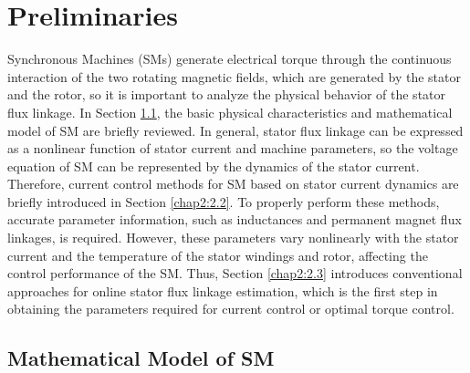 
\chapter{Preliminaries}\label{chapter2}
Synchronous Machines (SMs) generate electrical torque through the continuous interaction of the two rotating magnetic fields, which are generated by the stator and the rotor, so it is important to analyze the physical behavior of the stator flux linkage. In Section \ref{chap2:2.1}, the basic physical characteristics and mathematical model of SM are briefly reviewed. In general, stator flux linkage can be expressed as a nonlinear function of stator current and machine parameters, so the voltage equation of SM can be represented by the dynamics of the stator current. Therefore, current control methods for SM based on stator current dynamics are briefly introduced in Section \ref{chap2:2.2}. To properly perform these methods, accurate parameter information, such as inductances and permanent magnet flux linkages, is required. However, these parameters vary nonlinearly with the stator current and the temperature of the stator windings and rotor, affecting the control performance of the SM. Thus, Section \ref{chap2:2.3} introduces conventional approaches for online stator flux linkage estimation, which is the first step in obtaining the parameters required for current control or optimal torque control.

\section{Mathematical Model of SM}\label{chap2:2.1}
